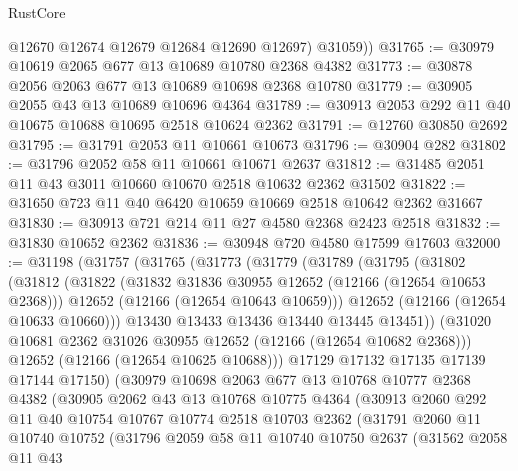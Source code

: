 \begin{lexlean}{RustCore}
\begin{coremodule}
          @12670
          @12674
          @12679
          @12684
          @12690
          @12697)
        @31059))
@31765 := @30979 @10619 @2065 @677 @13 @10689 @10780 @2368 @4382
@31773 := @30878 @2056 @2063 @677 @13 @10689 @10698 @2368 @10780
@31779 := @30905 @2055 @43 @13 @10689 @10696 @4364
@31789 := @30913 @2053 @292 @11 @40 @10675 @10688 @10695 @2518 @10624 @2362
@31791 := @12760 @30850 @2692
@31795 := @31791 @2053 @11 @10661 @10673
@31796 := @30904 @282
@31802 := @31796 @2052 @58 @11 @10661 @10671 @2637
@31812 := @31485 @2051 @11 @43 @3011 @10660 @10670 @2518 @10632 @2362 @31502
@31822 := @31650 @723 @11 @40 @6420 @10659 @10669 @2518 @10642 @2362 @31667
@31830 := @30913 @721 @214 @11 @27 @4580 @2368 @2423 @2518
@31832 := @31830 @10652 @2362
@31836 := @30948 @720 @4580 @17599 @17603
@32000 := @31198
    (@31757
      (@31765
        (@31773
          (@31779
            (@31789
              (@31795
                (@31802
                  (@31812
                    (@31822
                      (@31832 @31836 @30955 @12652 (@12166 (@12654 @10653 @2368)))
                      @12652
                      (@12166 (@12654 @10643 @10659)))
                    @12652
                    (@12166 (@12654 @10633 @10660)))
                  @13430
                  @13433
                  @13436
                  @13440
                  @13445
                  @13451))
              (@31020 @10681 @2362 @31026 @30955 @12652 (@12166 (@12654 @10682 @2368)))
              @12652
              (@12166 (@12654 @10625 @10688)))
            @17129
            @17132
            @17135
            @17139
            @17144
            @17150)
          (@30979
            @10698
            @2063
            @677
            @13
            @10768
            @10777
            @2368
            @4382
            (@30905
              @2062
              @43
              @13
              @10768
              @10775
              @4364
              (@30913
                @2060
                @292
                @11
                @40
                @10754
                @10767
                @10774
                @2518
                @10703
                @2362
                (@31791
                  @2060
                  @11
                  @10740
                  @10752
                  (@31796
                    @2059
                    @58
                    @11
                    @10740
                    @10750
                    @2637
                    (@31562
                      @2058
                      @11
                      @43

\end{coremodule}
\end{lexlean}
